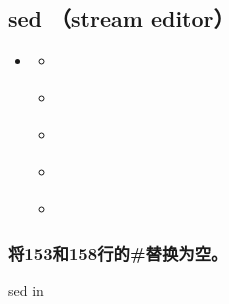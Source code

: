\documentclass[letterpaper,10pt,english]{sphinxmanual}
\begin{document}
\subsection{sed （stream editor）}
\label{\detokenize{scripts/shell/sed:sed-stream-editor}}\label{\detokenize{scripts/shell/sed::doc}}
\begin{sphinxShadowBox}
\begin{itemize}
\item {} 
\label{\detokenize{scripts/shell/sed:id5}}{\hyperref[\detokenize{scripts/shell/sed:sed-stream-editor}]{}}
\begin{itemize}
\item {} 
\label{\detokenize{scripts/shell/sed:id6}}{\hyperref[\detokenize{scripts/shell/sed:id1}]{}}

\item {} 
\label{\detokenize{scripts/shell/sed:id7}}{\hyperref[\detokenize{scripts/shell/sed:id2}]{}}

\item {} 
\label{\detokenize{scripts/shell/sed:id8}}{\hyperref[\detokenize{scripts/shell/sed:id3}]{}}

\item {} 
\label{\detokenize{scripts/shell/sed:id9}}{\hyperref[\detokenize{scripts/shell/sed:id4}]{}}

\item {} 
\label{\detokenize{scripts/shell/sed:id10}}{\hyperref[\detokenize{scripts/shell/sed:text}]{}}

\end{itemize}

\end{itemize}
\end{sphinxShadowBox}


\subsubsection{将153和158行的\#替换为空。}
\label{\detokenize{scripts/shell/sed:id1}}
%
\begin{sphinxVerbatim}[commandchars=\\\{\}]
sed \PYGZhy{}in  
\end{sphinxVerbatim}
\end{document}
